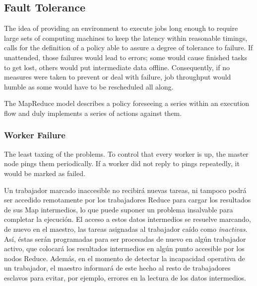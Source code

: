 \subsection{Fault Tolerance}\label{subsec:toleranciafallos}

\noindent The idea of providing an environment to execute jobs long enough to require large sets of computing machines to keep the latency within reasonable timings, calls for the definition of a policy able to assure a degree of tolerance to failure. If unattended, those failures would lead to errors; some would cause finished tasks to get lost, others would put intermediate data offline. Consequently, if no measures were taken to prevent or deal with failure, job throughput would humble as some would have to be rescheduled all along.

The MapReduce model describes a policy foreseeing a series within an execution flow and duly implements a series of actions against them.

\subsubsection{Worker Failure}\label{subsubsec:fallotrabajador}

\noindent The least taxing of the problems. To control that every worker is up, the master node pings them periodically. If a worker did not reply to pings repeatedly, it would be marked as failed.


Un trabajador marcado inaccesible no recibir\'a nuevas tareas, ni tampoco podr\'a ser accedido remotamente por los trabajadores Reduce para cargar los resultados de sus Map intermedios, lo que puede suponer un problema insalvable para completar la ejecuci\'on. El acceso a estos datos intermedios se resuelve marcando, de nuevo en el maestro, las tareas asignadas al trabajador ca\'ido como \emph{inactivas}. As\'i, \'estas ser\'an programadas para ser procesadas de nuevo en alg\'un trabajador activo, que colocar\'a los resultados intermedios en alg\'un punto accesible por los nodos Reduce. Adem\'as, en el momento de detectar la incapacidad operativa de un trabajador, el maestro informar\'a de este hecho al resto de trabajadores esclavos para evitar, por ejemplo, errores en la lectura de los datos intermedios.


